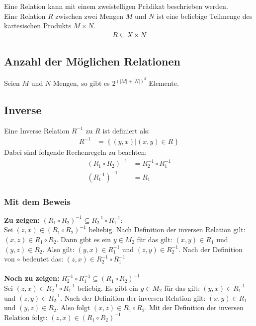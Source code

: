 Eine Relation kann mit einem zweistelligen Prädikat beschrieben werden.\\
Eine Relation $R$ zwischen zwei Mengen $M$ und $N$ ist eine beliebige Teilmenge des kartesischen Produkts $M\times N$.
\begin{align*}
    R\subseteq X\times N
\end{align*}

\subsection{Anzahl der Möglichen Relationen}\label{subsec:anzahl-der-moglichen-relationen}
Seien $M$ und $N$ Mengen, so gibt es $2^{(|M| + |N|)^2}$ Elemente.

\subsection{Inverse}\label{subsec:inverse}
Eine Inverse Relation $R^{-1}$ zu $R$ ist definiert als:
\begin{align*}
    R^{-1}&=\left\{(y, x)|(x, y)\in R\right\}
\end{align*}
Dabei sind folgende Rechenregeln zu beachten:
\begin{align*}
    (R_1\circ R_2)^{-1}&=R_2^{-1}\circ R_1^{-1}\\
    (R_1^{-1})^{-1}&=R_1
\end{align*}
\subsubsection{Mit dem Beweis}
\textbf{Zu zeigen:} $(R_1\circ R_2)^{-1}\subseteq R_2^{-1}\circ R_1^{-1}$:\\
Sei $(z,x)\in(R_1\circ R_2)^{-1}$ beliebig.
Nach Definition der inversen Relation gilt: $(x, z)\in R_1\circ R_2$.
Dann gibt es ein $y\in M_2$ für das gilt: $(x, y)\in R_1$ und $(y, z)\in R_2$.
Also gilt: $(y, x)\in R_1^{-1}$ und $(z, y)\in R_2^{-1}$.
Nach der Definition von $\circ$ bedeutet das: $(z, x)\in R_2^{-1}\circ R_1^{-1}$\\
\\
\textbf{Noch zu zeigen:} $R_2^{-1}\circ R_1^{-1}\subseteq (R_1\circ R_2)^{-1}$\\
Sei $(z, x)\in R_2^{-1}\circ R_1^{-1}$ beliebig.
Es gibt ein $y\in M_2$ für das gilt: $(y,x)\in R_1^{-1}$ und $(z, y)\in R_2^{-1}$.
Nach der Definition der inversen Relation gilt: $(x, y)\in R_1$ und $(y, z)\in R_2$.
Also folgt $(x, z)\in R_1\circ R_2$.
Mit der Definition der inversen Relation folgt: $(z, x)\in (R_1 \circ R_2)^{-1}$

